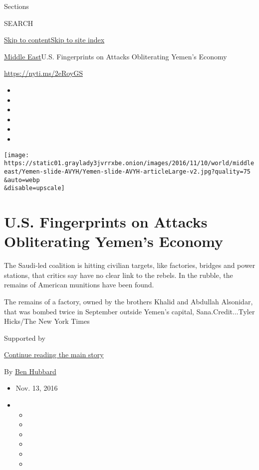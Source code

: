 Sections

SEARCH

\protect\hyperlink{site-content}{Skip to
content}\protect\hyperlink{site-index}{Skip to site index}

\href{/section/world/middleeast}{Middle East}\textbar{}U.S. Fingerprints
on Attacks Obliterating Yemen's Economy

\url{https://nyti.ms/2eRoyGS}

\begin{itemize}
\item
\item
\item
\item
\item
\item
\end{itemize}

\texttt{[image: https://static01.graylady3jvrrxbe.onion/images/2016/11/10/world/middleeast/Yemen-slide-AVYH/Yemen-slide-AVYH-articleLarge-v2.jpg?quality=75\\\&auto=webp\\\&disable=upscale]}

\hypertarget{us-fingerprints-on-attacks-obliterating-yemens-economy}{%
\section{U.S. Fingerprints on Attacks Obliterating Yemen's
Economy}\label{us-fingerprints-on-attacks-obliterating-yemens-economy}}

The Saudi-led coalition is hitting civilian targets, like factories,
bridges and power stations, that critics say have no clear link to the
rebels. In the rubble, the remains of American munitions have been
found.

The remains of a factory, owned by the brothers Khalid and Abdullah
Alsonidar, that was bombed twice in September outside Yemen's capital,
Sana.Credit...Tyler Hicks/The New York Times

Supported by

\protect\hyperlink{after-sponsor}{Continue reading the main story}

By \href{http://www.nytimes3xbfgragh.onion/by/ben-hubbard}{Ben Hubbard}

\begin{itemize}
\item
  Nov. 13, 2016
\item
  \begin{itemize}
  \item
  \item
  \item
  \item
  \item
  \item
  \end{itemize}
\end{itemize}

